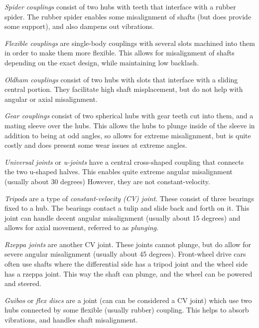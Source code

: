 	\begin{asparaenum}[a)]
		\item \textit{Spider couplings} consist of two hubs with teeth that interface with a rubber spider. The rubber spider enables some misalignment of shafts (but does provide some support), and also dampens out vibrations.
		\item \textit{Flexible couplings} are single-body couplings with several slots machined into them in order to make them more flexible. This allows for misalignment of shafts depending on the exact design, while maintaining low backlash.
		\item \textit{Oldham couplings} consist of two hubs with slots that interface with a sliding central portion. They facilitate high shaft misplacement, but do not help with angular or axial misalignment.
		\item \textit{Gear couplings} consist of two spherical hubs with gear teeth cut into them, and a mating sleeve over the hubs. This allows the hubs to plunge inside of the sleeve in addition to being at odd angles, so allows for extreme misalignment, but is quite costly and does present some wear issues at extreme angles.
		\item \textit{Universal joints} or \textit{u-joints} have a central cross-shaped coupling that connects the two u-shaped halves. This enables quite extreme angular misalignment (usually about 30 degrees) However, they are not constant-velocity.
		\item \textit{Tripods} are a type of \textit{constant-velocity (CV) joint}. These consist of three bearings fixed to a hub. The bearings contact a tulip and slide back and forth on it. This joint can handle decent angular misalignment (usually about 15 degrees) and allows for axial movement, referred to as \textit{plunging}.
		\item \textit{Rzeppa joints} are another CV joint. These joints cannot plunge, but do allow for severe angular misalignment (usually about 45 degrees). Front-wheel drive cars often use shafts where the differential side has a tripod joint and the wheel side has a rzeppa joint. This way the shaft can plunge, and the wheel can be powered and steered.
		\item \textit{Guibos} or \textit{flex discs} are a joint (can can be considered a CV joint) which use two hubs connected by some flexible (usually rubber) coupling. This helps to absorb vibrations, and handles shaft misalignment.
	\end{asparaenum}

